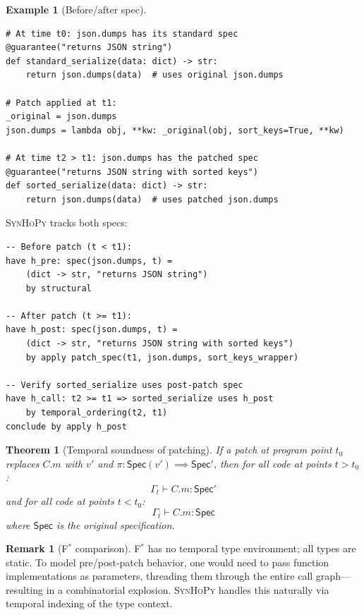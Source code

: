 \documentclass[11pt,a4paper]{report}
\theoremstyle{definition}
\newtheorem{example}[definition]{Example}
\newtheorem{remark}[definition]{Remark}
\theoremstyle{plain}
\newtheorem{theorem}[definition]{Theorem}
\newcommand{\Spec}{\mathsf{Spec}}
\newcommand{\fstar}{F$^{*}$}
\newcommand{\synhopy}{\textsc{SynHoPy}}
\begin{document}
\begin{example}[Before/after spec]
\begin{lstlisting}[style=synhopy]
# At time t0: json.dumps has its standard spec
@guarantee("returns JSON string")
def standard_serialize(data: dict) -> str:
    return json.dumps(data)  # uses original json.dumps

# Patch applied at t1:
_original = json.dumps
json.dumps = lambda obj, **kw: _original(obj, sort_keys=True, **kw)

# At time t2 > t1: json.dumps has the patched spec
@guarantee("returns JSON string with sorted keys")
def sorted_serialize(data: dict) -> str:
    return json.dumps(data)  # uses patched json.dumps
\end{lstlisting}

\synhopy{} tracks both specs:
\begin{lstlisting}[style=proof]
-- Before patch (t < t1):
have h_pre: spec(json.dumps, t) =
    (dict -> str, "returns JSON string")
    by structural

-- After patch (t >= t1):
have h_post: spec(json.dumps, t) =
    (dict -> str, "returns JSON string with sorted keys")
    by apply patch_spec(t1, json.dumps, sort_keys_wrapper)

-- Verify sorted_serialize uses post-patch spec
have h_call: t2 >= t1 => sorted_serialize uses h_post
    by temporal_ordering(t2, t1)
conclude by apply h_post
\end{lstlisting}
\end{example}

\begin{theorem}[Temporal soundness of patching]
\label{thm:temporal-sound}
If a patch at program point $t_0$ replaces $C.m$ with $v'$ and
$\pi : \Spec(v') \implies \Spec'$, then for all code at points $t > t_0$:
\[
  \Gamma_t \vdash C.m : \Spec'
\]
and for all code at points $t < t_0$:
\[
  \Gamma_t \vdash C.m : \Spec
\]
where $\Spec$ is the original specification.
\end{theorem}

\begin{remark}[\fstar{} comparison]
\fstar{} has no temporal type environment; all types are static. To model
pre/post-patch behavior, one would need to pass function implementations as
parameters, threading them through the entire call graph---resulting in a
combinatorial explosion. \synhopy{} handles this naturally via temporal
indexing of the type context.
\end{remark}
\end{document}

